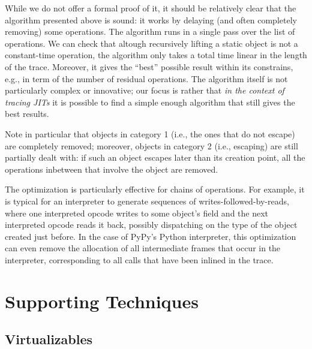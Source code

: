 \documentclass{sigplanconf}
\newcommand\ie{i.e.,\xspace}
\newcommand\eg{e.g.,\xspace}
\begin{document}
While we do not offer a formal proof of it, it should be relatively clear
that the algorithm presented above is sound: it works by delaying (and
often completely removing) some operations.  The algorithm runs in a
single pass over the list of operations.  We can check that altough
recursively lifting a static object is not a constant-time operation,
the algorithm only takes a total time linear in the length of the trace.
Moreover, it gives the ``best'' possible result within its constrains,
\eg in term of the number of residual operations.  The
algorithm itself is not particularly complex or innovative; our focus is
rather that \emph{in the context of tracing JITs} it is possible to find a
simple enough algorithm that still gives the best results.

Note in particular that objects in category 1 (\ie the ones that do
not escape) are completely removed; moreover, objects in category 2
(\ie escaping) are still partially dealt with: if such an object
escapes later than its creation point, all the operations inbetween that
involve the object are removed.

The optimization is particularly effective for chains of operations.
For example, it is typical for an interpreter to generate sequences of
writes-followed-by-reads, where one interpreted opcode writes to some
object's field and the next interpreted opcode reads it back, possibly
dispatching on the type of the object created just before.  In the case
of PyPy's Python interpreter, this optimization can even remove the
allocation of all intermediate frames that occur in the interpreter,
corresponding to all calls that have been inlined in the trace.





\section{Supporting Techniques}
\label{sec:support}

\subsection{Virtualizables}
\label{sub:Virtualizables}
\end{document}
